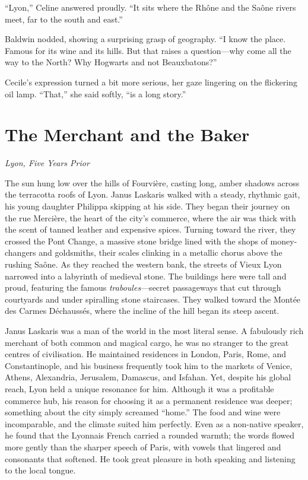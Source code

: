 \enquote{Lyon,} Celine answered proudly. \enquote{It sits where the Rhône and the Saône rivers meet, far to the south and east.}

Baldwin nodded, showing a surprising grasp of geography. \enquote{I know the place. Famous for its wine and its hills. But that raises a question---why come all the way to the North? Why Hogwarts and not Beauxbatons?}

Cecile's expression turned a bit more serious, her gaze lingering on the flickering oil lamp. \enquote{That,} she said softly, \enquote{is a long story.}

\section*{The Merchant and the Baker}

\textit{Lyon, Five Years Prior}

The sun hung low over the hills of Fourvière, casting long, amber shadows across the terracotta roofs of Lyon. Janus Laskaris walked with a steady, rhythmic gait, his young daughter Philippa skipping at his side. They began their journey on the rue Mercière, the heart of the city's commerce, where the air was thick with the scent of tanned leather and expensive spices. Turning toward the river, they crossed the Pont Change, a massive stone bridge lined with the shops of money-changers and goldsmiths, their scales clinking in a metallic chorus above the rushing Saône. As they reached the western bank, the streets of Vieux Lyon narrowed into a labyrinth of medieval stone. The buildings here were tall and proud, featuring the famous \textit{traboules}---secret passageways that cut through courtyards and under spiralling stone staircases. They walked toward the Montée des Carmes Déchaussés, where the incline of the hill began its steep ascent.

Janus Laskaris was a man of the world in the most literal sense. A fabulously rich merchant of both common and magical cargo, he was no stranger to the great centres of civilisation. He maintained residences in London, Paris, Rome, and Constantinople, and his business frequently took him to the markets of Venice, Athens, Alexandria, Jerusalem, Damascus, and Isfahan. Yet, despite his global reach, Lyon held a unique resonance for him. Although it was a profitable commerce hub, his reason for choosing it as a permanent residence was deeper; something about the city simply screamed \enquote{home.} The food and wine were incomparable, and the climate suited him perfectly. Even as a non-native speaker, he found that the Lyonnais French carried a rounded warmth; the words flowed more gently than the sharper speech of Paris, with vowels that lingered and consonants that softened. He took great pleasure in both speaking and listening to the local tongue.

